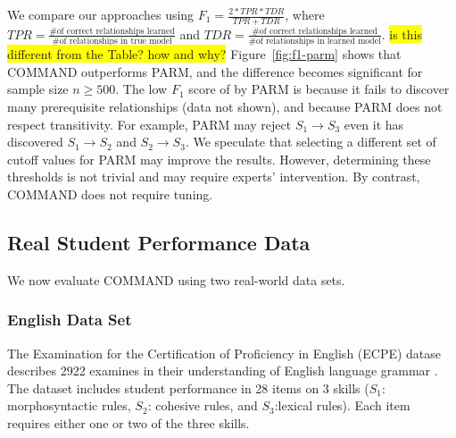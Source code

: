 \documentclass{edm_template}
\newcommand{\hl}[1]{\colorbox{yellow}{#1}}
\begin{document}
	We compare our approaches using 
	$F_1=\frac{2*TPR*TDR}{TPR+TDR}$, where $TPR=\frac{\text{\# of correct relationships learned}}{\text{\# of relationships in true model}}$
	and $TDR=\frac{\text{\# of correct relationships learned}}{\text{\# of relationships in learned model}}$. \hl{is this different from the Table? how and why?} 
	Figure~\ref{fig:f1-parm} shows that COMMAND  outperforms PARM, and the difference becomes significant for sample size $n\ge 500$.
	The low $F_1$ score of by PARM is %
	because it fails to discover many prerequisite relationships (data not shown), and because  PARM does not respect transitivity.
	For example, PARM may reject $S_1\rightarrow S_3$ even it has discovered $S_1\rightarrow S_2$ and $S_2\rightarrow S_3$.
	We speculate that selecting a different set of cutoff values for PARM may improve the results.
	However, determining these thresholds is not trivial and may require experts' intervention. By contrast, COMMAND does not require tuning. %
	
			
			
		
					
	\subsection{Real Student Performance Data}
	\label{sec:real}
	We now evaluate COMMAND using two real-world data sets.	
	
	\subsubsection{English Data Set}
	The Examination for the Certification of Proficiency in English (ECPE) datase describes 2922 examines in their understanding of English language grammar \cite{templin2014hierarchical}.
	The dataset includes student performance in 28 items on 3 skills ($S_1$: morphosyntactic rules, $S_2$: cohesive rules,
	and $S_3$:lexical rules). Each item requires either one or two of the three skills.
	
\end{document}
